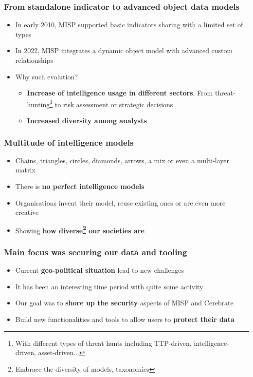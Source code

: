\begin{frame}
  \frametitle{From standalone indicator to advanced object data models}
  \begin{itemize}
    \item In early 2010, MISP supported basic indicators sharing with a limited set of types
    \item In 2022, MISP integrates a dynamic object model with advanced custom relationships 
    \item Why such evolution?
        \begin{itemize}
            \item {\bf Increase of intelligence usage in different sectors}. From threat-hunting\footnote{With different types of threat hunts including TTP-driven, intelligence-driven, asset-driven...} to risk assessment or strategic decisions
            \item {\bf Increased diversity among analysts}
        \end{itemize}
  \end{itemize}
\end{frame}

\begin{frame}
  \frametitle{Multitude of intelligence models}
  \begin{itemize}
     \item Chains, triangles, circles, diamonds, arrows, a mix or even a multi-layer matrix
     \item There is {\bf no perfect intelligence models}
     \item Organisations invent their model, reuse existing ones or are even more creative
     \item Showing {\bf how diverse\footnote{Embrace the diversity of models, taxonomies} our societies are}
  \end{itemize}
\end{frame}

\begin{frame}
  \frametitle{Main focus was securing our data and tooling}
  \begin{itemize}
      \item Current {\bf geo-political situation} lead to new challenges
      \item It has been an interesting time period with quite some activity
      \item Our goal was to {\bf shore up the security} aspects of MISP and Cerebrate
      \item Build new functionalities and tools to allow users to {\bf protect their data}
  \end{itemize}
\end{frame}


